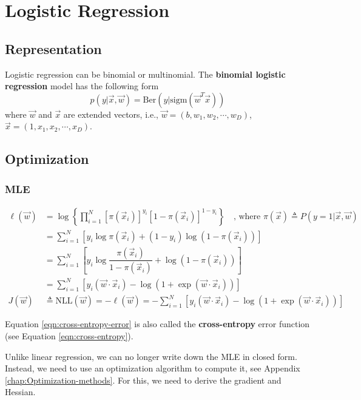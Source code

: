 \chapter{Logistic Regression}


\section{Representation}
Logistic regression can be binomial or multinomial. The \textbf{binomial logistic regression} model has the following form
\begin{equation}
p(y|\vec{x},\vec{w})=\mathrm{Ber}(y|\mathrm{sigm}(\vec{w}^T\vec{x}))
\end{equation}
where $\vec{w}$ and $\vec{x}$ are extended vectors, i.e., $\vec{w}=(b, w_1, w_2,\cdots, w_D)$, $\vec{x}=(1, x_1, x_2,\cdots, x_D)$.


\section{Optimization}
\label{sec:binomial-LR-Optimization}

\subsection{MLE}
\begin{align}
\ell(\vec{w}) &= \log\left\{\prod\limits_{i=1}^N{\left[\pi(\vec{x}_i)\right]^{y_i}\left[1-\pi(\vec{x}_i)\right]^{1-y_i}}\right\} \quad \text{, where } \pi(\vec{x}) \triangleq P(y=1|\vec{x},\vec{w}) \nonumber \\
           &= \sum\limits_{i=1}^N\left[y_i\log\pi(\vec{x}_i)+(1-y_i)\log(1-\pi(\vec{x}_i))\right] \label{eqn:cross-entropy-error} \\
		   &= \sum\limits_{i=1}^N\left[y_i\log\dfrac{\pi(\vec{x}_i)}{1-\pi(\vec{x}_i)}+\log(1-\pi(\vec{x}_i))\right] \nonumber \\
		   &= \sum\limits_{i=1}^N\left[y_i(\vec{w}\cdot\vec{x}_i)-\log(1+\exp(\vec{w}\cdot\vec{x}_i))\right] \nonumber \\
J(\vec{w}) & \triangleq \mathrm{NLL}(\vec{w})= -\ell(\vec{w}) = -\sum\limits_{i=1}^N\left[y_i(\vec{w}\cdot\vec{x}_i)-\log(1+\exp(\vec{w}\cdot\vec{x}_i))\right] 
\end{align}

Equation \eqref{eqn:cross-entropy-error} is also called the \textbf{cross-entropy} error function (see Equation \eqref{eqn:cross-entropy}).

Unlike linear regression, we can no longer write down the MLE in closed form. Instead, we need to use an optimization algorithm to compute it, see Appendix \ref{chap:Optimization-methods}. For this, we need to derive the gradient and Hessian.

